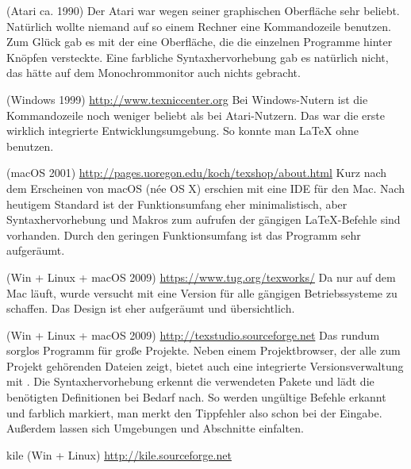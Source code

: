 \begin{labeling}{}
\item[\Program{TeXShell}] (Atari ca. 1990) Der Atari war wegen seiner
  graphischen Oberfläche sehr beliebt.  Natürlich wollte niemand auf so
  einem Rechner eine Kommandozeile benutzen.  Zum Glück gab es mit der
   eine Oberfläche, die die einzelnen Programme hinter
  Knöpfen versteckte.  Eine farbliche Syntaxhervorhebung gab es natürlich
  nicht, das hätte auf dem Monochrommonitor auch nichts gebracht.

\item[\Program{TexnicCenter}] (Windows 1999)
  \url{http://www.texniccenter.org}  Bei Windows-Nutern ist die
  Kommandozeile noch weniger beliebt als bei Atari-Nutzern.  Das
   war die erste wirklich integrierte
  Entwicklungsumgebung.  So konnte man \LaTeX{} ohne 
  benutzen.

\item[\Program{Texshop}] (macOS 2001)
  \url{http://pages.uoregon.edu/koch/texshop/about.html}  Kurz nach dem
  Erscheinen von macOS (née OS X) erschien mit  eine IDE
  für den Mac.  Nach heutigem Standard ist der Funktionsumfang eher
  minimalistisch, aber Syntaxhervorhebung und Makros zum aufrufen der
  gängigen \LaTeX{}-Befehle sind vorhanden.  Durch den geringen
  Funktionsumfang ist das Programm sehr aufgeräumt.

\item[\Program{TeXworks}] (Win + Linux + macOS 2009)
  \url{https://www.tug.org/texworks/}  Da  nur auf dem Mac
  läuft, wurde versucht mit  eine Version für alle
  gängigen Betriebssysteme zu schaffen.  Das Design ist eher aufgeräumt und
  übersichtlich.

\item[\Program{TeXStudio}] (Win + Linux + macOS 2009)
  \url{http://texstudio.sourceforge.net}  Das rundum sorglos Programm für
  große Projekte. Neben einem Projektbrowser, der alle zum Projekt
  gehörenden Dateien zeigt, bietet  auch eine integrierte
  Versionsverwaltung mit .  Die Syntaxhervorhebung erkennt die
  verwendeten Pakete und lädt die benötigten Definitionen bei Bedarf nach.
  So werden ungültige Befehle erkannt und farblich markiert, man merkt den
  Tippfehler also schon bei der Eingabe. Außerdem lassen sich Umgebungen
  und Abschnitte einfalten.

\item[kile] (Win + Linux) \url{http://kile.sourceforge.net}

\end{labeling}

